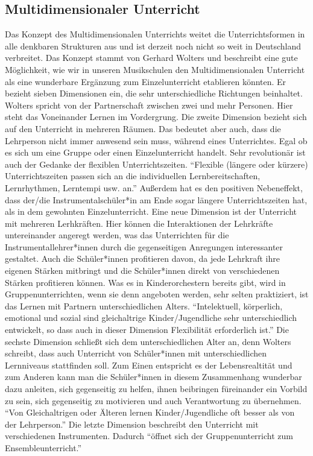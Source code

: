 \subsection{Multidimensionaler Unterricht} 
Das Konzept des Multidimensionalen Unterrichts weitet die Unterrichtsformen in
alle denkbaren Strukturen aus und ist derzeit noch nicht so weit in Deutschland
verbreitet. Das Konzept stammt von Gerhard Wolters und beschreibt eine gute
Möglichkeit, wie wir in unseren Musikschulen den Multidimensionalen Unterricht
als eine wunderbare Ergänzung zum Einzelunterricht etablieren könnten. Er
bezieht sieben Dimensionen ein, die sehr unterschiedliche Richtungen beinhaltet.
\autocite[86ff]{ernst:die_zukunftsfaehige_musikschule} Wolters spricht von der
Partnerschaft zwischen zwei und mehr Personen. Hier steht das Voneinander Lernen
im Vordergrung. Die zweite Dimension bezieht sich auf den Unterricht in mehreren
Räumen. Das bedeutet aber auch, dass die Lehrperson nicht immer anwesend sein
muss, während eines Unterrichtes. Egal ob es sich um eine Gruppe oder einen
Einzelunterricht handelt. Sehr revolutionär ist auch der Gedanke der flexiblen
Unterrichtszeiten. \enquote{Flexible (längere oder kürzere) Unterrichtszeiten
passen sich an die individuellen Lernbereitschaften, Lernrhythmen, Lerntempi
usw. an.} \autocite[87]{ernst:die_zukunftsfaehige_musikschule} Außerdem hat es
den positiven Nebeneffekt, dass der/die Instrumentalschüler*in am Ende sogar
längere Unterrichtszeiten hat, als in dem gewohnten Einzelunterricht. Eine neue
Dimension ist der Unterricht mit mehreren Lerhkräften. Hier können die
Interaktionen der Lehrkräfte untereinander angeregt werden, was das Unterrichten
für die Instrumentallehrer*innen durch die gegenseitigen Anregungen
interessanter gestaltet. Auch die Schüler*innen profitieren davon, da jede
Lehrkraft ihre eigenen Stärken mitbringt und die Schüler*innen direkt von
verschiedenen Stärken profitieren können. Was es in Kinderorchestern bereits
gibt, wird in Gruppenunterrichten, wenn sie denn angeboten werden, sehr selten
praktiziert, ist das Lernen mit Partnern unterschiedlichen Alters.
\enquote{Intelektuell, körperlich, emotional und sozial sind gleichaltrige
Kinder/Jugendliche sehr unterschiedlich entwickelt, so dass auch in dieser
Dimension Flexibilität erforderlich ist.}
\autocite[87]{ernst:die_zukunftsfaehige_musikschule} Die sechste Dimension
schließt sich dem unterschiedlichen Alter an, denn Wolters schreibt, dass auch
Unterricht von Schüler*innen mit unterschiedlichen Lernniveaus stattfinden soll.
Zum Einen entspricht es der Lebensrealtität und zum Anderen kann man die
Schüler*innen in diesem Zusammenhang wunderbar dazu anleiten, sich gegenseitig
zu helfen, ihnen beibringen füreinander ein Vorbild zu sein, sich gegenseitig zu
motivieren und auch Verantwortung zu übernehmen. \enquote{Von Gleichaltrigen
oder Älteren lernen Kinder/Jugendliche oft besser als von der Lehrperson.}
\autocite[87]{ernst:die_zukunftsfaehige_musikschule} Die letzte Dimension
beschreibt den Unterricht mit verschiedenen Instrumenten. Dadurch
\enquote{öffnet sich der Gruppenunterricht zum Ensembleunterricht.}
\autocite[87]{ernst:die_zukunftsfaehige_musikschule}

